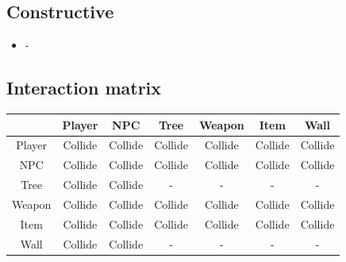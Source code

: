         \subsection{Constructive}
            \begin{itemize}
                \item -
            \end{itemize}
    \subsection{Interaction matrix}
    \begin{center}
        \begin{tabular}{ |c|c|c|c|c|c|c| } 
            \hline
             & Player & NPC & Tree & Weapon & Item & Wall \\
             \hline
             Player & Collide & Collide & Collide & Collide & Collide & Collide \\
             \hline
             NPC & Collide & Collide & Collide & Collide & Collide & Collide \\
             \hline
             Tree & Collide & Collide & - & - & - & - \\
             \hline
             Weapon & Collide & Collide & Collide & Collide & Collide & Collide \\
             \hline
             Item & Collide & Collide & Collide & Collide & Collide & Collide \\
             \hline
             Wall & Collide & Collide & - & - & - & - \\
            \hline
        \end{tabular}
    \end{center}